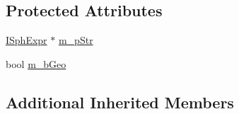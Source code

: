 \subsection*{Protected Attributes}
\begin{DoxyCompactItemize}
\item 
\hyperlink{structISphExpr}{I\-Sph\-Expr} $\ast$ \hyperlink{classExpr__ContainsStrattr__c_ad1da2599cb74183bd40353c305caff18}{m\-\_\-p\-Str}
\item 
bool \hyperlink{classExpr__ContainsStrattr__c_ab6c47018657407f1572fb8c354484974}{m\-\_\-b\-Geo}
\end{DoxyCompactItemize}
\subsection*{Additional Inherited Members}


